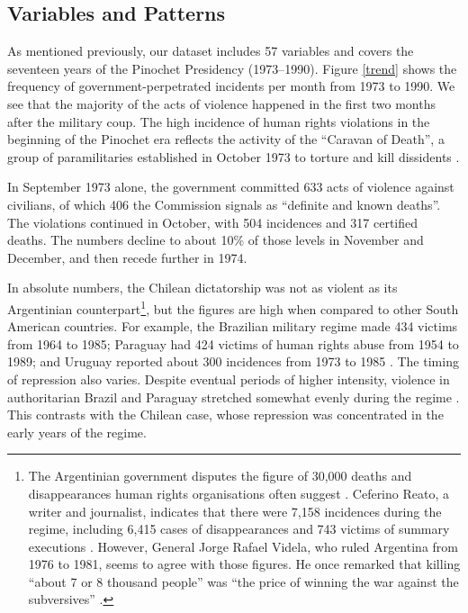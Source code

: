 \documentclass[12pt,a4paper,]{article}
\begin{document}
\hypertarget{variables-and-patterns}{%
\subsection{Variables and Patterns}\label{variables-and-patterns}}

As mentioned previously, our dataset includes 57 variables and covers
the seventeen years of the Pinochet Presidency (1973--1990). Figure
\ref{trend} shows the frequency of government-perpetrated incidents per
month from 1973 to 1990. We see that the majority of the acts of
violence happened in the first two months after the military coup. The
high incidence of human rights violations in the beginning of the
Pinochet era reflects the activity of the ``Caravan of Death'', a group
of paramilitaries established in October 1973 to torture and kill
dissidents
\citetext{\citealp[459]{davis1990they}; \citealp{verdugo2001chile}}.

In September 1973 alone, the government committed 633 acts of violence
against civilians, of which 406 the Commission signals as ``definite and
known deaths''. The violations continued in October, with 504 incidences
and 317 certified deaths. The numbers decline to about 10\% of those
levels in November and December, and then recede further in 1974.

In absolute numbers, the Chilean dictatorship was not as violent as its
Argentinian counterpart\footnote{The Argentinian government disputes the
  figure of 30,000 deaths and disappearances human rights organisations
  often suggest \citep{bbc2016argentina, elpais2016argentina}. Ceferino
  Reato, a writer and journalist, indicates that there were 7,158
  incidences during the regime, including 6,415 cases of disappearances
  and 743 victims of summary executions \citep{clarin2016argentina}.
  However, General Jorge Rafael Videla, who ruled Argentina from 1976 to
  1981, seems to agree with those figures. He once remarked that killing
  ``about 7 or 8 thousand people'' was ``the price of winning the war
  against the subversives'' \citep{clarin2012videla}.}, but the figures
are high when compared to other South American countries. For example,
the Brazilian military regime made 434 victims from 1964 to 1985;
Paraguay had 424 victims of human rights abuse from 1954 to 1989; and
Uruguay reported about 300 incidences from 1973 to 1985
\citep{elpais2014ditadura, fsp2016argentina}. The timing of repression
also varies. Despite eventual periods of higher intensity, violence in
authoritarian Brazil and Paraguay stretched somewhat evenly during the
regime \citep{agenciabrasil2014ditadura, elpais2014ditadura}. This
contrasts with the Chilean case, whose repression was concentrated in
the early years of the regime.
\end{document}
